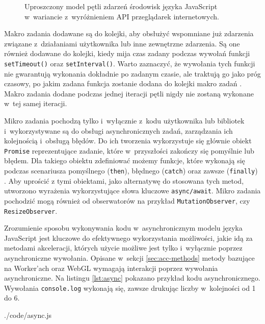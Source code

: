 \begin{figure}[ht]
    \centering
    
    \caption{Uproszczony model pętli zdarzeń środowisk języka JavaScript w~wariancie z~wyróżnieniem API przeglądarek internetowych.}
    \label{fig:event-loop}
\end{figure}


Makro zadania dodawane są do kolejki, aby obsłużyć wspomniane już zdarzenia związane z~działaniami użytkownika lub inne zewnętrzne zdarzenia. Są one również dodawane do kolejki, kiedy mija czas zadany podczas wywołań funkcji \lstinline{setTimeout()} oraz \lstinline{setInterval()}. Warto zaznaczyć, że wywołania tych funkcji nie gwarantują wykonania dokładnie po zadanym czasie, ale traktują go jako próg czasowy, po jakim zadana funkcja zostanie dodana do kolejki makro zadań \cite{setTimeout}. Makro zadania dodane podczas jednej iteracji pętli nigdy nie zostaną wykonane w~tej samej iteracji.

Mikro zadania pochodzą tylko i~wyłącznie z~kodu użytkownika lub bibliotek i~wykorzystywane są do obsługi asynchronicznych zadań, zarządzania ich kolejnością i~obsługą błędów\cite{runtime}. Do ich tworzenia wykorzystuje się głównie obiekt \lstinline{Promise} reprezentujące zadanie, które w~przyszłości zakończy się pomyślnie lub błędem. Dla takiego obiektu zdefiniować możemy funkcje, które wykonają się podczas scenariusza pomyślnego (\lstinline{then}), błędnego (\lstinline{catch}) oraz zawsze (\lstinline{finally}) \cite{promise}. Aby uprościć z tymi obiektami, jako alternatywę do stosowana tych metod, utworzono wyrażenia wykorzystujące słowa kluczowe \lstinline{async/await}. Mikro zadania pochodzić mogą również od obserwatorów na przykład \lstinline{MutationObserver}, czy \lstinline{ResizeObserver}. 

Zrozumienie sposobu wykonywania kodu w~asynchronicznym modelu języka JavaScript jest kluczowe do efektywnego wykorzystania możliwości, jakie idą za metodami akceleracji, których użycie możliwe jest tylko i~wyłącznie poprzez asynchroniczne wywołania. Opisane w~sekcji \ref{sec:acc-methods} metody bazujące na Worker'ach oraz WebGL wymagają interakcji poprzez wywołania asynchroniczne. Na listingu \ref{lst:async} pokazano przykład kodu asynchronicznego. Wywołania \mbox{\lstinline{console.log}} wykonają się, zawsze drukując liczby w~kolejności od 1 do 6.

 {./code/async.js}

